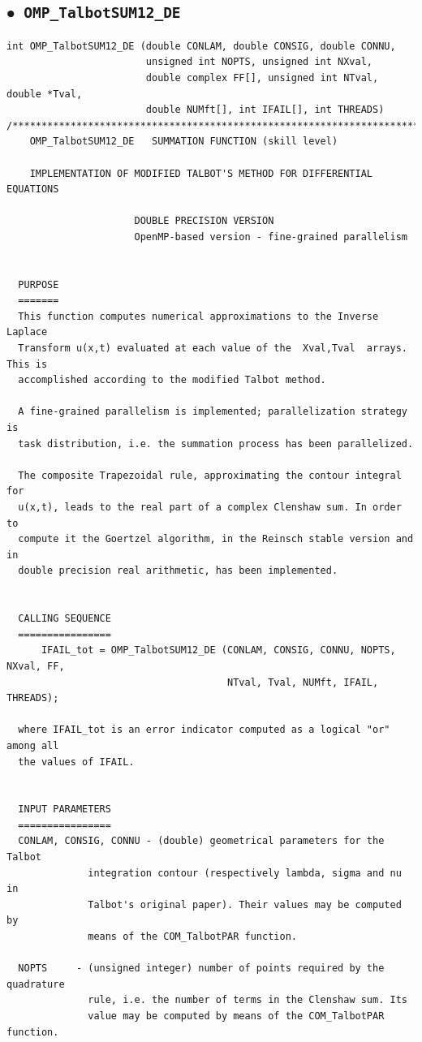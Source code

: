 \documentclass[a4paper,10pt]{report}%
\begin{document}
\subsection{\texorpdfstring{$\boldsymbol{\bullet}$}{ - }{\tt\ OMP\_TalbotSUM12\_DE}}
\begin{lstlisting}
int OMP_TalbotSUM12_DE (double CONLAM, double CONSIG, double CONNU,
                        unsigned int NOPTS, unsigned int NXval,
                        double complex FF[], unsigned int NTval, double *Tval,
                        double NUMft[], int IFAIL[], int THREADS)
/*****************************************************************************
    OMP_TalbotSUM12_DE   SUMMATION FUNCTION (skill level)

    IMPLEMENTATION OF MODIFIED TALBOT'S METHOD FOR DIFFERENTIAL EQUATIONS

                      DOUBLE PRECISION VERSION
                      OpenMP-based version - fine-grained parallelism


  PURPOSE
  =======
  This function computes numerical approximations to the Inverse Laplace
  Transform u(x,t) evaluated at each value of the  Xval,Tval  arrays. This is
  accomplished according to the modified Talbot method.

  A fine-grained parallelism is implemented; parallelization strategy is
  task distribution, i.e. the summation process has been parallelized.

  The composite Trapezoidal rule, approximating the contour integral for
  u(x,t), leads to the real part of a complex Clenshaw sum. In order to
  compute it the Goertzel algorithm, in the Reinsch stable version and in
  double precision real arithmetic, has been implemented.


  CALLING SEQUENCE
  ================
      IFAIL_tot = OMP_TalbotSUM12_DE (CONLAM, CONSIG, CONNU, NOPTS, NXval, FF,
                                      NTval, Tval, NUMft, IFAIL, THREADS);

  where IFAIL_tot is an error indicator computed as a logical "or" among all
  the values of IFAIL.


  INPUT PARAMETERS
  ================
  CONLAM, CONSIG, CONNU - (double) geometrical parameters for the Talbot
              integration contour (respectively lambda, sigma and nu in
              Talbot's original paper). Their values may be computed by
              means of the COM_TalbotPAR function.

  NOPTS     - (unsigned integer) number of points required by the quadrature
              rule, i.e. the number of terms in the Clenshaw sum. Its
              value may be computed by means of the COM_TalbotPAR function.


\end{lstlisting}
\end{document}
